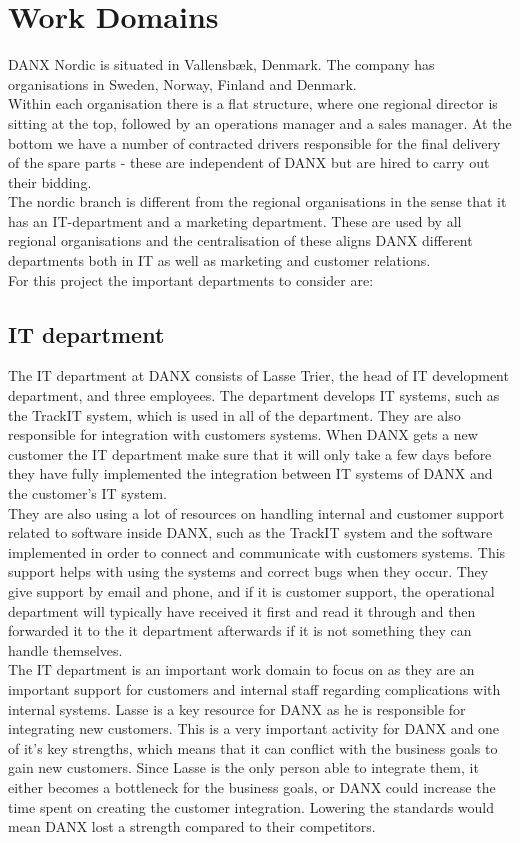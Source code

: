 \section{Work Domains}
DANX Nordic is situated in Vallensbæk, Denmark. The company has organisations in Sweden, Norway, Finland and Denmark.\\
Within each organisation there is a flat structure\cite{gert028}, where one regional director is sitting at the top, followed by an operations manager and a sales manager. At the bottom we have a number of contracted drivers responsible for the final delivery of the spare parts \cite{gert022}\cite{malene002} - these are independent of DANX but are hired to carry out their bidding.\\
The nordic branch is different from the regional organisations in the sense that it has an IT-department and a marketing department. These are used by all regional organisations and the centralisation of these aligns DANX different departments both in IT as well as marketing and customer relations.\\
For this project the important departments to consider are:

\subsection{IT department}
The IT department at DANX consists of Lasse Trier, the head of IT development department\cite{lasse014}, and three employees. The department develops IT systems, such as the TrackIT system\cite{lasse015}, which is used in all of the department. They are also responsible for integration with customers systems. When DANX gets a new customer the IT department make sure that it will only take a few days before they have fully implemented the integration between IT systems of DANX and the customer’s IT system.\cite{lasse008}\\
They are also using a lot of resources on handling internal and customer support related to software inside DANX\cite{lasse016}, such as the TrackIT system and the software implemented in order to connect and communicate with customers systems. This support helps with using the systems and correct bugs when they occur. They give support by email and phone, and if it is customer support, the operational department will typically have received it first and read it through and then forwarded it to the it department afterwards\cite{lasse001} if it is not something they can handle themselves.\cite{lasse017} \\
The IT department is an important work domain to focus on as they are an important support for customers and internal staff regarding complications with internal systems. Lasse is a key resource for DANX as he is responsible for integrating new customers.\cite{lasse018} This is a very important activity for DANX and one of it’s key strengths, which means that it can conflict with the business goals to gain new customers. Since Lasse is the only person able to integrate them, it either becomes a bottleneck for the business goals, or DANX could increase the time spent on creating the customer integration. Lowering the standards would mean DANX lost a strength compared to their competitors.

